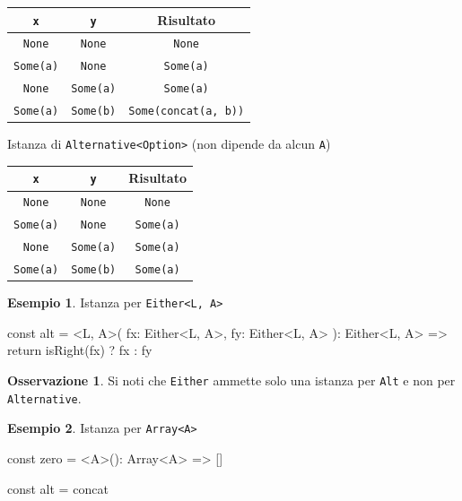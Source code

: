 \documentclass[12pt]{article}
\theoremstyle{definition}
\newtheorem{example}{Esempio}[section]
\newtheorem{observation}{Osservazione}[section]
\newenvironment{code}
  {\vspace{0.5cm} \VerbatimEnvironment\begin{typescriptcode}}
  {\end{typescriptcode} \vspace{0.2cm}}
\begin{document}
\begin{center}
\bgroup
\def\arraystretch{1.5}
\begin{tabular}{ |c|c|c| }
\hline
\texttt{x} & \texttt{y} & Risultato \\
\hline
\texttt{None} & \texttt{None} & \texttt{None} \\
\hline
\texttt{Some(a)} & \texttt{None} & \texttt{Some(a)} \\
\hline
\texttt{None} & \texttt{Some(a)} & \texttt{Some(a)} \\
\hline
\texttt{Some(a)} & \texttt{Some(b)} & \texttt{Some(concat(a, b))} \\
\hline
\end{tabular}
\egroup
\end{center}

Istanza di \texttt{Alternative<Option>} (non dipende da alcun \texttt{A})

\begin{center}
\bgroup
\def\arraystretch{1.5}
\begin{tabular}{ |c|c|c| }
\hline
\texttt{x} & \texttt{y} & Risultato \\
\hline
\texttt{None} & \texttt{None} & \texttt{None} \\
\hline
\texttt{Some(a)} & \texttt{None} & \texttt{Some(a)} \\
\hline
\texttt{None} & \texttt{Some(a)} & \texttt{Some(a)} \\
\hline
\texttt{Some(a)} & \texttt{Some(b)} & \texttt{Some(a)} \\
\hline
\end{tabular}
\egroup
\end{center}

\begin{example}
Istanza per \texttt{Either<L, A>}

\begin{code}
const alt = <L, A>(
  fx: Either<L, A>,
  fy: Either<L, A>
): Either<L, A> => {
  return isRight(fx) ? fx : fy
}
\end{code}
\end{example}

\begin{observation}
Si noti che \texttt{Either} ammette solo una istanza per \texttt{Alt} e non per \texttt{Alternative}.
\end{observation}

\begin{example}
Istanza per \texttt{Array<A>}

\begin{code}
const zero = <A>(): Array<A> => []

const alt = concat
\end{code}
\end{example}
\end{document}
